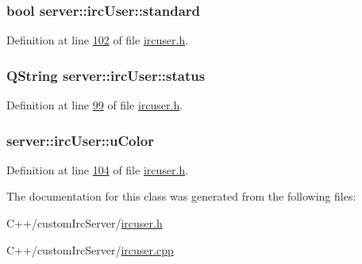 \hypertarget{classserver_1_1irc_user_ac91172ae6a09106ed851634d1e7c6553}{
\subsubsection[{standard}]{\setlength{\rightskip}{0pt plus 5cm}bool server\-::irc\-User\-::standard\hspace{0.3cm}{\ttfamily [private]}}}\label{d2/d29/classserver_1_1irc_user_ac91172ae6a09106ed851634d1e7c6553}


Definition at line \hyperlink{custom_irc_server_2ircuser_8h_source_l00102}{102} of file \hyperlink{custom_irc_server_2ircuser_8h_source}{ircuser.\-h}.

\hypertarget{classserver_1_1irc_user_acf198f11436cfa83a42048850d276c95}{
\subsubsection[{status}]{\setlength{\rightskip}{0pt plus 5cm}Q\-String server\-::irc\-User\-::status\hspace{0.3cm}{\ttfamily [private]}}}\label{d2/d29/classserver_1_1irc_user_acf198f11436cfa83a42048850d276c95}


Definition at line \hyperlink{custom_irc_server_2ircuser_8h_source_l00099}{99} of file \hyperlink{custom_irc_server_2ircuser_8h_source}{ircuser.\-h}.

\hypertarget{classserver_1_1irc_user_a84807f272b7a5b30396f0b726c25202e}{
\subsubsection[{u\-Color}]{ server\-::irc\-User\-::u\-Color\hspace{0.3cm}{\ttfamily [private]}}}\label{d2/d29/classserver_1_1irc_user_a84807f272b7a5b30396f0b726c25202e}


Definition at line \hyperlink{custom_irc_server_2ircuser_8h_source_l00104}{104} of file \hyperlink{custom_irc_server_2ircuser_8h_source}{ircuser.\-h}.



The documentation for this class was generated from the following files\-:\begin{DoxyCompactItemize}
\item 
C++/custom\-Irc\-Server/\hyperlink{custom_irc_server_2ircuser_8h}{ircuser.\-h}\item 
C++/custom\-Irc\-Server/\hyperlink{custom_irc_server_2ircuser_8cpp}{ircuser.\-cpp}\end{DoxyCompactItemize}

